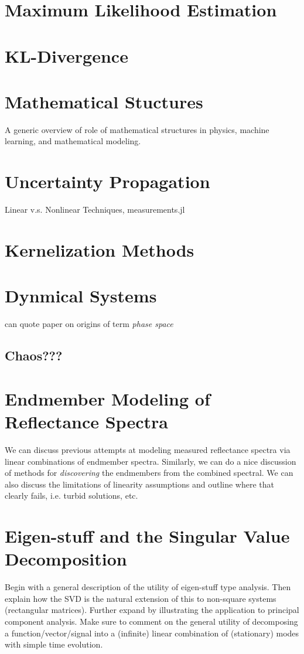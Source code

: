 \section{Maximum Likelihood Estimation}

\section{KL-Divergence}

\section{Mathematical Stuctures}
A generic overview of role of mathematical structures in physics, machine learning, and mathematical modeling.

\section{Uncertainty Propagation}
Linear v.s. Nonlinear Techniques, measurements.jl

\section{Kernelization Methods}


\section{Dynmical Systems}
can quote paper on origins of term \textit{phase space}
\subsection{Chaos???}


\section{Endmember Modeling of Reflectance Spectra}
We can discuss previous attempts at modeling measured reflectance spectra via linear combinations of endmember spectra. Similarly, we can do a nice discussion of methods for \textit{discovering} the endmembers from the combined spectral. We can also discuss the limitations of linearity assumptions and outline where that clearly fails, i.e. turbid solutions, etc.


\section{Eigen-stuff and the Singular Value Decomposition}
Begin with a general description of the utility of eigen-stuff type analysis. Then explain how the SVD is the natural extension of this to non-square systems (rectangular matrices). Further expand by illustrating the application to principal component analysis. Make sure to comment on the general utility of decomposing a function/vector/signal into a (infinite) linear combination of (stationary) modes with simple time evolution.


